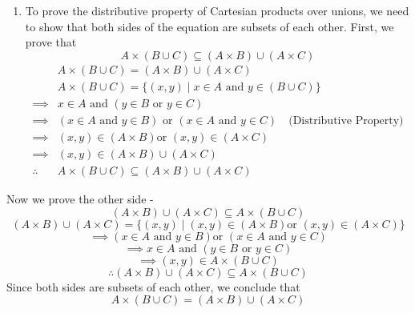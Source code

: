 \documentclass{article}
\begin{document}
\begin{enumerate}
\begin{itemize}
        \item Let $P$ be a relation on a set $S$. We need to prove or disprove that if $P$ is reflexive and symmetric, then it is also transitive.
        This is false. We can provide a counterexample to disprove this statement. Consider the set $S = \{1, 2, 3\}$ and the relation - $$P = \{(1, 1), (2, 2), (3, 3), (1, 2), (2, 1), (2, 3), (3, 2)\}$$
        The relation $P$ is reflexive because it contains the pairs $(1, 1)$, $(2, 2)$, and $(3, 3)$. It is also symmetric because for every pair $(a, b)$ in $P$, the pair $(b, a)$ is also in $P$. However, $P$ is not transitive because it contains the pairs $(1, 2)$ and $(2, 3)$ but does not contain the pair $(1, 3)$. Therefore, we have found a counterexample, and the statement is false.
    \end{itemize}
    \item To prove the distributive property of Cartesian products over unions, we need to show that both sides of the equation are subsets of each other.
    First, we prove that
    $$A \times (B \cup C) \subseteq (A \times B) \cup (A \times C)$$
    \begin{align*}
        &A \times (B \cup C) = (A \times B) \cup (A \times C) \\
        &A \times (B \cup C) = \{(x, y) \mid x \in A \text{ and } y \in (B \cup C)\} \\
        \implies &x \in A \text{ and } (y \in B \text{ or } y \in C) \\
        \implies &(x \in A \text{ and } y \in B) \text{ or } (x \in A \text{ and } y \in C)\quad \text{(Distributive Property)} \\ 
        \implies &(x, y) \in (A \times B) \text {or } (x, y) \in (A \times C) \\
        \implies &(x, y) \in (A \times B) \cup (A \times C) \\
        \therefore &A \times (B \cup C) \subseteq (A \times B) \cup (A \times C)
    \end{align*}
\end{enumerate}

Now we prove the other side - 
$$(A \times B) \cup (A \times C) \subseteq A \times (B \cup C)$$
$$(A \times B) \cup (A \times C) = \{(x, y) \mid (x, y) \in (A \times B) \text {or } (x, y) \in (A \times C)\}$$
$$\implies (x \in A \text{ and } y \in B) \text {or } (x \in A \text{ and } y \in C)$$
$$\implies x \in A \text{ and } (y \in B \text{ or } y \in C)$$
$$\implies (x, y) \in A \times (B \cup C)$$
$$\therefore (A \times B) \cup (A \times C) \subseteq A \times (B \cup C)$$
Since both sides are subsets of each other, we conclude that
$$A \times (B \cup C) = (A \times B) \cup (A \times C)$$
\end{document}
